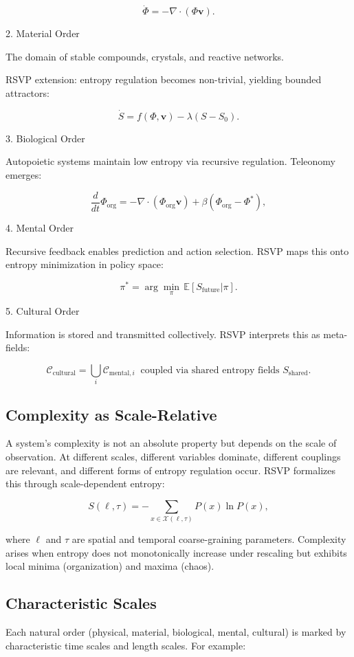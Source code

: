 \documentclass[12pt]{book}
\begin{document}
\[ \dot{\Phi} = -\nabla \cdot (\Phi \mathbf{v}). \]

2. Material Order

The domain of stable compounds, crystals, and reactive networks.

RSVP extension: entropy regulation becomes non-trivial, yielding bounded attractors:

\[ \dot{S} = f(\Phi, \mathbf{v}) - \lambda (S-S_0). \]

3. Biological Order

Autopoietic systems maintain low entropy via recursive regulation. Teleonomy emerges:

\[ \frac{d}{dt}\Phi_{\text{org}} = -\nabla \cdot (\Phi_{\text{org}}\mathbf{v}) + \beta(\Phi_{\text{org}} - \Phi^*), \]

4. Mental Order

Recursive feedback enables prediction and action selection. RSVP maps this onto entropy minimization in policy space:

\[ \pi^* = \arg\min_\pi \, \mathbb{E}[S_{\text{future}}|\pi]. \]

5. Cultural Order

Information is stored and transmitted collectively. RSVP interprets this as meta-fields:

\[ \mathcal{C}_{\text{cultural}} = \bigcup_i \mathcal{C}_{\text{mental}, i} \;\; \text{coupled via shared entropy fields } S_{\text{shared}}. \]

\subsection{Complexity as Scale-Relative}
A system’s complexity is not an absolute property but depends on the scale of observation. At different scales, different variables dominate, different couplings are relevant, and different forms of entropy regulation occur. RSVP formalizes this through scale-dependent entropy:

\[ S(\ell, \tau) = -\sum_{x \in \mathcal{X}(\ell, \tau)} P(x) \ln P(x), \]

where \( \ell \) and \( \tau \) are spatial and temporal coarse-graining parameters. Complexity arises when entropy does not monotonically increase under rescaling but exhibits local minima (organization) and maxima (chaos).

\subsection{Characteristic Scales}
Each natural order (physical, material, biological, mental, cultural) is marked by characteristic time scales and length scales. For example:
\end{document}
